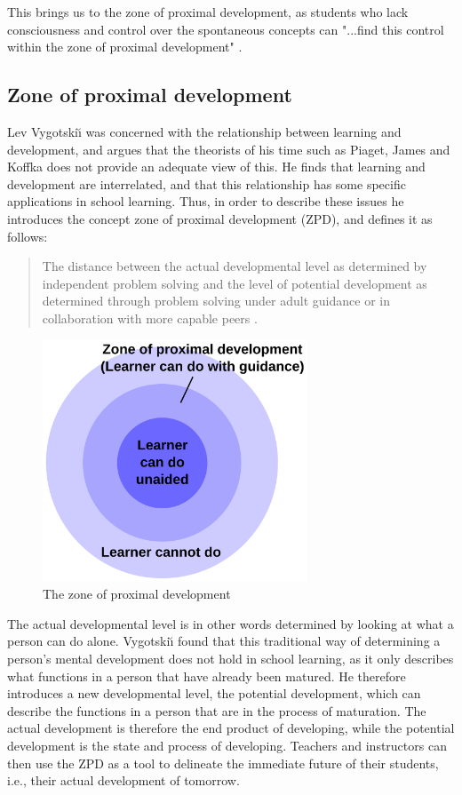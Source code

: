 This brings us to the zone of proximal development, as students who lack consciousness and control over the spontaneous concepts can "...find this control within the zone of proximal development" \citep[p. 194]{vygotsky2012thought}.

\subsection{Zone of proximal development}
Lev Vygotski{\u\i} was concerned with the relationship between learning and development, and argues that the theorists of his time such as Piaget, James and Koffka does not provide an adequate view of this. He finds that learning and development are interrelated, and that this relationship has some specific applications in school learning. \citep[p. 84]{vygotskiui1978mind} Thus, in order to describe these issues he introduces the concept zone of proximal development (ZPD), and defines it as follows:

\begin{quote}The distance between the actual developmental level as determined by independent problem solving and the level of potential development as determined through problem solving under adult guidance or in collaboration with more capable peers \citep[p. 86]{vygotskiui1978mind}.
\end{quote}

\begin{figure}
\centering
\includegraphics[width=0.7\textwidth]{img/theoretical/zpd.png}
\caption{The zone of proximal development \citep{wiki:zpd}}
\label{fig:zpd}
\end{figure}

The actual developmental level is in other words determined by looking at what a person can do alone. Vygotski{\u\i} found that this traditional way of determining a person's mental development does not hold in school learning, as it only describes what functions in a person that have already been matured. He therefore introduces a new developmental level, the potential development, which can describe the functions in a person that are in the process of maturation. The actual development is therefore the end product of developing, while the potential development is the state and process of developing. Teachers and instructors can then use the ZPD as a tool to delineate the immediate future of their students, i.e., their actual development of tomorrow.

